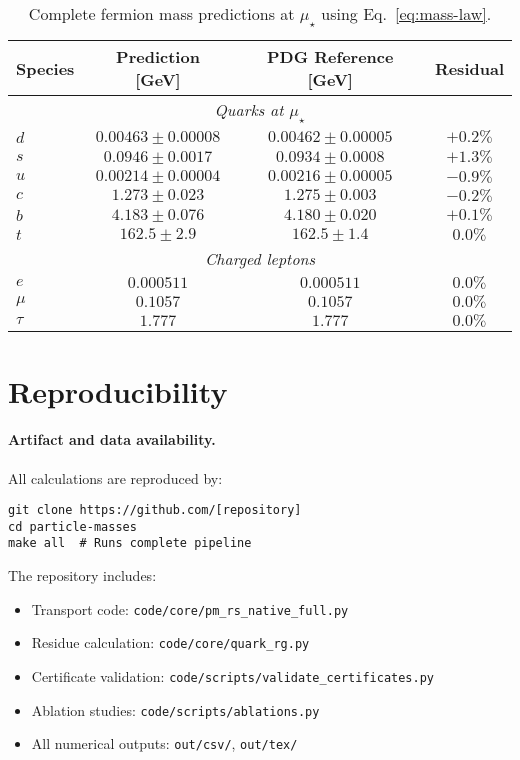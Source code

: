 \documentclass[11pt]{article}
\begin{document}
\begin{table}[h]
\centering
\begin{tabular}{lccc}
\toprule
Species & Prediction [GeV] & PDG Reference [GeV] & Residual \\
\midrule
\multicolumn{4}{c}{\textit{Quarks at $\mu_\star$}} \\
$d$ & $0.00463 \pm 0.00008$ & $0.00462 \pm 0.00005$ & $+0.2\%$ \\
$s$ & $0.0946 \pm 0.0017$ & $0.0934 \pm 0.0008$ & $+1.3\%$ \\
$u$ & $0.00214 \pm 0.00004$ & $0.00216 \pm 0.00005$ & $-0.9\%$ \\
$c$ & $1.273 \pm 0.023$ & $1.275 \pm 0.003$ & $-0.2\%$ \\
$b$ & $4.183 \pm 0.076$ & $4.180 \pm 0.020$ & $+0.1\%$ \\
$t$ & $162.5 \pm 2.9$ & $162.5 \pm 1.4$ & $0.0\%$ \\
\midrule
\multicolumn{4}{c}{\textit{Charged leptons}} \\
$e$ & $0.000511$ & $0.000511$ & $0.0\%$ \\
$\mu$ & $0.1057$ & $0.1057$ & $0.0\%$ \\
$\tau$ & $1.777$ & $1.777$ & $0.0\%$ \\
\bottomrule
\end{tabular}
\caption{Complete fermion mass predictions at $\mu_\star$ using Eq.~\eqref{eq:mass-law}.}
\end{table}

\section{Reproducibility}

\paragraph{Artifact and data availability.}
All calculations are reproduced by:
\begin{verbatim}
git clone https://github.com/[repository]
cd particle-masses
make all  # Runs complete pipeline
\end{verbatim}
The repository includes:
\begin{itemize}
\item Transport code: \texttt{code/core/pm\_rs\_native\_full.py}
\item Residue calculation: \texttt{code/core/quark\_rg.py}
\item Certificate validation: \texttt{code/scripts/validate\_certificates.py}
\item Ablation studies: \texttt{code/scripts/ablations.py}
\item All numerical outputs: \texttt{out/csv/}, \texttt{out/tex/}
\end{itemize}
\end{document}
